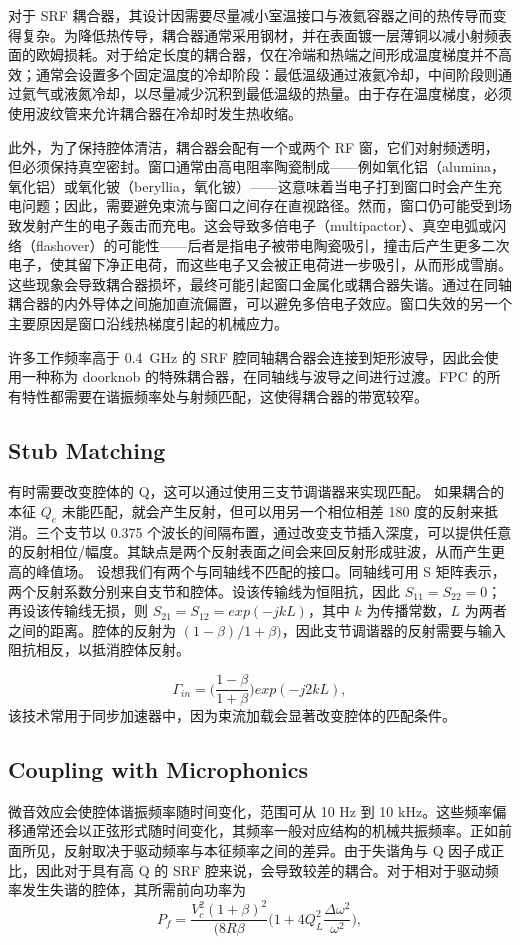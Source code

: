 \documentclass{cernyrep}
\begin{document}
对于 SRF 耦合器，其设计因需要尽量减小室温接口与液氦容器之间的热传导而变得复杂。为降低热传导，耦合器通常采用钢材，并在表面镀一层薄铜以减小射频表面的欧姆损耗。对于给定长度的耦合器，仅在冷端和热端之间形成温度梯度并不高效；通常会设置多个固定温度的冷却阶段：最低温级通过液氦冷却，中间阶段则通过氦气或液氮冷却，以尽量减少沉积到最低温级的热量。由于存在温度梯度，必须使用波纹管来允许耦合器在冷却时发生热收缩。

此外，为了保持腔体清洁，耦合器会配有一个或两个 RF 窗，它们对射频透明，但必须保持真空密封。窗口通常由高电阻率陶瓷制成——例如氧化铝（alumina，氧化铝）或氧化铍（beryllia，氧化铍）——这意味着当电子打到窗口时会产生充电问题；因此，需要避免束流与窗口之间存在直视路径。然而，窗口仍可能受到场致发射产生的电子轰击而充电。这会导致多倍电子（multipactor）、真空电弧或闪络（flashover）的可能性——后者是指电子被带电陶瓷吸引，撞击后产生更多二次电子，使其留下净正电荷，而这些电子又会被正电荷进一步吸引，从而形成雪崩。这些现象会导致耦合器损坏，最终可能引起窗口金属化或耦合器失谐。通过在同轴耦合器的内外导体之间施加直流偏置，可以避免多倍电子效应。窗口失效的另一个主要原因是窗口沿线热梯度引起的机械应力。

许多工作频率高于 0.4~GHz 的 SRF 腔同轴耦合器会连接到矩形波导，因此会使用一种称为 doorknob 的特殊耦合器，在同轴线与波导之间进行过渡。FPC 的所有特性都需要在谐振频率处与射频匹配，这使得耦合器的带宽较窄。

\subsection {Stub Matching}
有时需要改变腔体的 Q，这可以通过使用三支节调谐器来实现匹配。
如果耦合的本征 $Q_e$ 未能匹配，就会产生反射，但可以用另一个相位相差 180 度的反射来抵消。三个支节以 0.375 个波长的间隔布置，通过改变支节插入深度，可以提供任意的反射相位/幅度。其缺点是两个反射表面之间会来回反射形成驻波，从而产生更高的峰值场。
设想我们有两个与同轴线不匹配的接口。同轴线可用 S 矩阵表示，两个反射系数分别来自支节和腔体。设该传输线为恒阻抗，因此 $S_{11}=S_{22}=0$；再设该传输线无损，则 $S_{21}=S_{12}=exp(-jkL)$，其中 $k$ 为传播常数，$L$ 为两者之间的距离。腔体的反射为 $(1-\beta)/1+\beta)$，因此支节调谐器的反射需要与输入阻抗相反，以抵消腔体反射。

\begin{equation}
\label{eqn_Stub}
\Gamma_{in} =  \Bigg(  \frac{1- \beta}{1+ \beta} \Bigg) exp(-j 2 k L),
\end{equation}
该技术常用于同步加速器中，因为束流加载会显著改变腔体的匹配条件。

\subsection {Coupling with Microphonics}
微音效应会使腔体谐振频率随时间变化，范围可从 10 Hz 到 10 kHz。这些频率偏移通常还会以正弦形式随时间变化，其频率一般对应结构的机械共振频率。正如前面所见，反射取决于驱动频率与本征频率之间的差异。由于失谐角与 Q 因子成正比，因此对于具有高 Q 的 SRF 腔来说，会导致较差的耦合。对于相对于驱动频率发生失谐的腔体，其所需前向功率为
\begin{equation}
\label{eqn_Pfmicro}
P_f =  \frac{V_c^2 (1+\beta)^2}{(8 R \beta} \Big( 1+4 Q_L^2 \frac{\Delta \omega^2}{\omega^2} \Big),
\end{equation}
\end{document}
